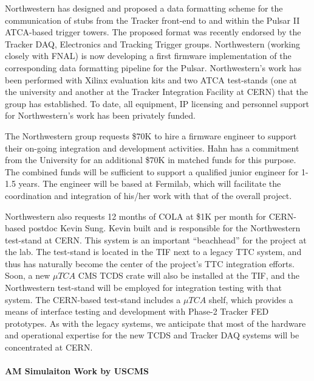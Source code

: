 Northwestern has designed and proposed a data formatting scheme for the communication of stubs from the Tracker front-end to and within the Pulsar II ATCA-based trigger towers.  The proposed format was recently endorsed by the Tracker DAQ, Electronics and Tracking Trigger groups.  Northwestern (working closely with FNAL) is now developing a first firmware implementation of the corresponding data formatting pipeline for the Pulsar. Northwestern's work has been performed with Xilinx evaluation kits and two ATCA test-stands (one at the university and another at the Tracker Integration Facility at CERN) that the group has established.  To date, all equipment, IP licensing and personnel support for Northwestern's work has been privately funded.

The Northwestern group requests \$70K to hire a firmware engineer to support their on-going integration and development activities.  Hahn has a commitment from the University for an additional \$70K in matched funds for this purpose.  The combined funds will be sufficient to support a qualified junior engineer for 1-1.5 years.  The engineer will be based at Fermilab, which will facilitate the coordination and integration of his/her work with that of the overall project.

Northwestern also requests 12 months of COLA at \$1K per month for CERN-based postdoc Kevin Sung.  Kevin built and is responsible for the Northwestern test-stand at CERN.  This system is an important ``beachhead'' for the project at the lab.  The test-stand is located in the TIF next to a legacy TTC system, and thus has naturally become the center of the project's TTC integration efforts.  Soon, a new $\mu TCA$ CMS TCDS crate will also be installed at the TIF, and the Northwestern test-stand will be employed for integration testing with that system.  The CERN-based test-stand includes a $\mu TCA$ shelf, which provides a means of interface testing and development with Phase-2 Tracker FED prototypes.  As with the legacy systems, we anticipate that most of the hardware and operational expertise for the new TCDS and Tracker DAQ systems will be concentrated at CERN.



\paragraph{AM Simulaiton Work by USCMS}

